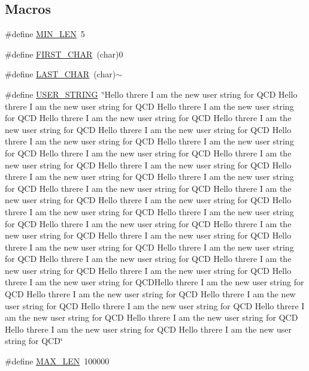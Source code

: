 \subsection*{Macros}
\begin{DoxyCompactItemize}
\item 
\#define \mbox{\hyperlink{adat-devel_2other__libs_2filedb_2filehash_2twrite_8c_aa69f8dba9add1a52ce3cf7bcfafcfda0}{M\+I\+N\+\_\+\+L\+EN}}~5
\item 
\#define \mbox{\hyperlink{adat-devel_2other__libs_2filedb_2filehash_2twrite_8c_af1c5fd90d1b8a22169133f549223f2e1}{F\+I\+R\+S\+T\+\_\+\+C\+H\+AR}}~(char)\textquotesingle{}0\textquotesingle{}
\item 
\#define \mbox{\hyperlink{adat-devel_2other__libs_2filedb_2filehash_2twrite_8c_a31911f021a0d09eed9a5269d0648dfde}{L\+A\+S\+T\+\_\+\+C\+H\+AR}}~(char)\textquotesingle{}$\sim$\textquotesingle{}
\item 
\#define \mbox{\hyperlink{adat-devel_2other__libs_2filedb_2filehash_2twrite_8c_a5fdc86a0c07ccece3ef65e2f46c0ffd4}{U\+S\+E\+R\+\_\+\+S\+T\+R\+I\+NG}}~\char`\"{}Hello threre I am the new user string for Q\+CD Hello threre I am the new user string for Q\+CD Hello threre I am the new user string for Q\+CD Hello threre I am the new user string for Q\+CD Hello threre I am the new user string for Q\+CD Hello threre I am the new user string for Q\+CD Hello threre I am the new user string for Q\+CD Hello threre I am the new user string for Q\+CD Hello threre I am the new user string for Q\+CD Hello threre I am the new user string for Q\+CD Hello threre I am the new user string for Q\+CD Hello threre I am the new user string for Q\+CD Hello threre I am the new user string for Q\+CD Hello threre I am the new user string for Q\+CD Hello threre I am the new user string for Q\+CD Hello threre I am the new user string for Q\+CD Hello threre I am the new user string for Q\+CD Hello threre I am the new user string for Q\+CD Hello threre I am the new user string for Q\+CD Hello threre I am the new user string for Q\+CD Hello threre I am the new user string for Q\+CD Hello threre I am the new user string for Q\+CD Hello threre I am the new user string for Q\+CD Hello threre I am the new user string for Q\+CD Hello threre I am the new user string for Q\+CD Hello threre I am the new user string for Q\+CD Hello threre I am the new user string for Q\+C\+D\+Hello threre I am the new user string for Q\+CD  Hello threre I am the new user string for Q\+CD Hello threre I am the new user string for Q\+CD Hello threre I am the new user string for Q\+CD Hello threre I am the new user string for Q\+CD Hello threre I am the new user string for Q\+CD Hello threre I am the new user string for Q\+CD Hello threre I am the new user string for Q\+CD\char`\"{}
\item 
\#define \mbox{\hyperlink{adat-devel_2other__libs_2filedb_2filehash_2twrite_8c_aabf4f709c8199e41cf279c77112345fe}{M\+A\+X\+\_\+\+L\+EN}}~100000
\end{DoxyCompactItemize}

